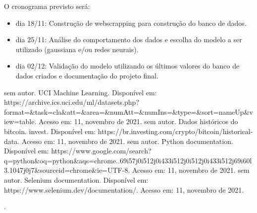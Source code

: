 \documentclass[conference]{IEEEtran}
\begin{document}
O cronograma previsto será:

\begin{itemize}
    \item dia 18/11: Construção de webscrapping para construção do banco de dados.
    \item dia 25/11: Análise do comportamento dos dados e escolha do modelo a ser utilizado (gaussiana e/ou redes neurais).
    \item dia 02/12: Validação do modelo utilizando os últimos valores do banco de dados criados e documentação do projeto final.
\end{itemize}

\begin{thebibliography}{00}
 sem autor. UCI Machine Learning. Disponível em: https://archive.ics.uci.edu/ml/datasets.php?format=\&task=cla\&att=\&area=\&numAtt=\&numIns=\&type=\&sort=nameUp\&view=table. Acesso em: 11, novembro de 2021.
 sem autor. Dados históricos do bitcoin. invest. Disponível em: https://br.investing.com/crypto/bitcoin/historical-data. Acesso em: 11, novembro de 2021.
 sem autor. Python documentation. Disponível em: https://www.google.com/search?q=python\&oq=python\&aqs=chrome..69i57j0i512j0i433i512j0i512j0i433i512j69i60l3.1047j0j7\&sourceid=chrome\&ie=UTF-8.  Acesso em: 11, novembro de 2021.
 sem autor. Selenium documentation. Disponível em: https://www.selenium.dev/documentation/.  Acesso em: 11, novembro de 2021.
\end{thebibliography}
\vspace{12pt}
\color{red}.
\end{document}

